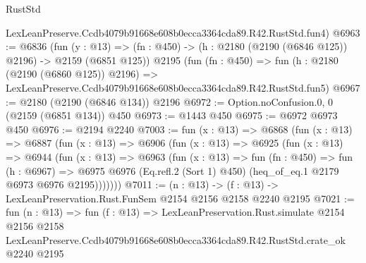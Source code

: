 \begin{lexlean}{RustStd}
\begin{coremodule}
    LexLeanPreserve.Ccdb4079b91668e608b0ecca3364cda89.R42.RustStd.fun4)
@6963 := @6836
    (fun (y : @13) => (fn : @450) -> (h : @2180 (@2190 (@6846 @125)) @2196) -> @2159 (@6851 @125))
    @2195
    (fun (fn : @450) =>
    fun (h : @2180 (@2190 (@6860 @125)) @2196) =>
    LexLeanPreserve.Ccdb4079b91668e608b0ecca3364cda89.R42.RustStd.fun5)
@6967 := @2180 (@2190 (@6846 @134)) @2196
@6972 := Option.noConfusion.{0, 0} (@2159 (@6851 @134)) @450
@6973 := @1443 @450
@6975 := @6972 @6973 @450
@6976 := @2194 @2240
@7003 := fun (x : @13) =>
  @6868
    (fun (x : @13) =>
    @6887
      (fun (x : @13) =>
      @6906
        (fun (x : @13) =>
        @6925
          (fun (x : @13) =>
          @6944
            (fun (x : @13) =>
            @6963
              (fun (x : @13) =>
              fun (fn : @450) =>
              fun (h : @6967) =>
              @6975 @6976 (Eq.refl.{2} (Sort 1) @450) (heq_of_eq.{1} @2179 @6973 @6976 @2195)))))))
@7011 := (n : @13) -> (f : @13) -> LexLeanPreservation.Rust.FunSem @2154 @2156 @2158 @2240 @2195
@7021 := fun (n : @13) =>
  fun (f : @13) =>
  LexLeanPreservation.Rust.simulate
    @2154
    @2156
    @2158
    LexLeanPreserve.Ccdb4079b91668e608b0ecca3364cda89.R42.RustStd.crate_ok
    @2240
    @2195
\end{coremodule}
\end{lexlean}
